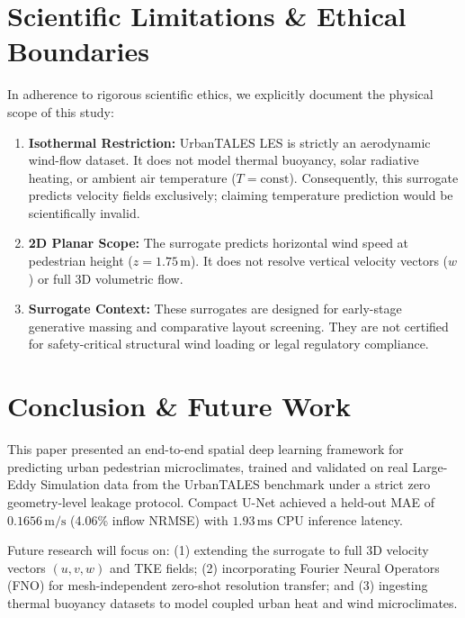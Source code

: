 \documentclass[10pt,twocolumn]{article}
\begin{document}
\section{Scientific Limitations & Ethical Boundaries}
In adherence to rigorous scientific ethics, we explicitly document the physical scope of this study:
\begin{enumerate}
    \item \textbf{Isothermal Restriction:} UrbanTALES LES is strictly an aerodynamic wind-flow dataset. It does not model thermal buoyancy, solar radiative heating, or ambient air temperature ($T = \text{const}$). Consequently, this surrogate predicts velocity fields exclusively; claiming temperature prediction would be scientifically invalid.
    \item \textbf{2D Planar Scope:} The surrogate predicts horizontal wind speed at pedestrian height ($z = 1.75\,\text{m}$). It does not resolve vertical velocity vectors ($w$) or full 3D volumetric flow.
    \item \textbf{Surrogate Context:} These surrogates are designed for early-stage generative massing and comparative layout screening. They are not certified for safety-critical structural wind loading or legal regulatory compliance.
\end{enumerate}

\section{Conclusion & Future Work}
This paper presented an end-to-end spatial deep learning framework for predicting urban pedestrian microclimates, trained and validated on real Large-Eddy Simulation data from the UrbanTALES benchmark under a strict zero geometry-level leakage protocol. Compact U-Net achieved a held-out MAE of $0.1656\,\text{m/s}$ (4.06\% inflow NRMSE) with $1.93\,\text{ms}$ CPU inference latency.

Future research will focus on: (1) extending the surrogate to full 3D velocity vectors $(u, v, w)$ and TKE fields; (2) incorporating Fourier Neural Operators (FNO) for mesh-independent zero-shot resolution transfer; and (3) ingesting thermal buoyancy datasets to model coupled urban heat and wind microclimates.
\end{document}
